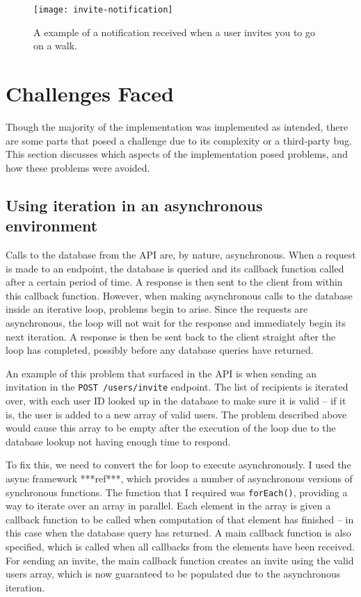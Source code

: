 \begin{figure}[hbt]
  \centering
  \texttt{[image: invite-notification]}
  \caption{A example of a notification received when a user invites you to go on a walk.}
  \label{fig:invite-notification}
\end{figure}


\section{Challenges Faced}

Though the majority of the implementation was implemented as intended, there are some parts that posed a challenge due to its complexity or a third-party bug. This section discusses which aspects of the implementation posed problems, and how these problems were avoided.

\subsection{Using iteration in an asynchronous environment}

Calls to the database from the API are, by nature, asynchronous. When a request is made to an endpoint, the database is queried and its callback function called after a certain period of time. A response is then sent to the client from within this callback function. However, when making asynchronous calls to the database inside an iterative loop, problems begin to arise. Since the requests are asynchronous, the loop will not wait for the response and immediately begin its next iteration. A response is then be sent back to the client straight after the loop has completed, possibly before any database queries have returned.

An example of this problem that surfaced in the API is when sending an invitation in the \verb|POST /users/invite| endpoint. The list of recipients is iterated over, with each user ID looked up in the database to make sure it is valid -- if it is, the user is added to a new array of valid users. The problem described above would cause this array to be empty after the execution of the loop due to the database lookup not having enough time to respond.

To fix this, we need to convert the for loop to execute asynchronously. I used the async framework ***ref***, which provides a number of asynchronous versions of synchronous functions. The function that I required was \verb|forEach()|, providing a way to iterate over an array in parallel. Each element in the array is given a callback function to be called when computation of that element has finished -- in this case when the database query has returned. A main callback function is also specified, which is called when all callbacks from the elements have been received. For sending an invite, the main callback function creates an invite using the valid users array, which is now guaranteed to be populated due to the asynchronous iteration.

